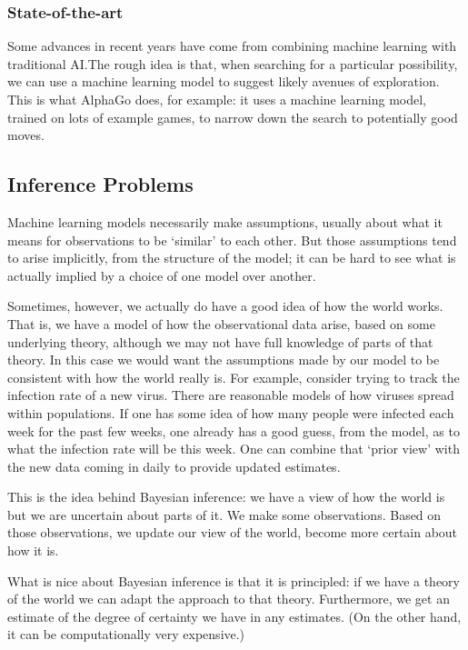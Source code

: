 \documentclass[10pt, a4paper, twocolumn]{article}
\begin{document}
\subsubsection{State-of-the-art}

Some advances in recent years have come from combining machine learning with
traditional AI.\@ The rough idea is that, when searching for a particular
possibility, we can use a machine learning model to suggest likely avenues of
exploration. This is what AlphaGo does, for example: it uses a machine learning
model, trained on lots of example games, to narrow down the search to
potentially good moves.

\subsection{Inference Problems}

Machine learning models necessarily make assumptions, usually about what it
means for observations to be `similar' to each other. But those assumptions tend
to arise implicitly, from the structure of the model; it can be hard to see what
is actually implied by a choice of one model over another.

Sometimes, however, we actually do have a good idea of how the world works. That
is, we have a model of how the observational data arise, based on some
underlying theory, although we may not have full knowledge of parts of that
theory. In this case we would want the assumptions made by our model to be
consistent with how the world really is. For example, consider trying to track
the infection rate of a new virus. There are reasonable models of how viruses
spread within populations. If one has some idea of how many people were infected
each week for the past few weeks, one already has a good guess, from the model,
as to what the infection rate will be this week. One can combine that `prior
view' with the new data coming in daily to provide updated estimates.

This is the idea behind Bayesian inference: we have a view of how the world is
but we are uncertain about parts of it. We make some observations. Based on
those observations, we update our view of the world, become more certain about
how it is.

What is nice about Bayesian inference is that it is principled: if we have a
theory of the world we can adapt the approach to that theory. Furthermore, we
get an estimate of the degree of certainty we have in any estimates. (On the
other hand, it can be computationally very expensive.)
\end{document}

